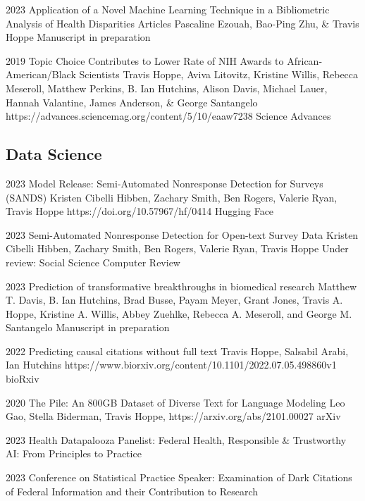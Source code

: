 \documentclass[]{scrartcl}
\begin{document}
\begin{cleanCV}
\Paper
{2023}
{Application of a Novel Machine Learning Technique in a Bibliometric Analysis of Health Disparities Articles}
{Pascaline Ezouah, Bao-Ping Zhu, \& Travis Hoppe}
{}{Manuscript in preparation}

\Paper
{2019}
{Topic Choice Contributes to Lower Rate of NIH Awards to African-American/Black Scientists}
{Travis Hoppe, Aviva Litovitz, Kristine Willis, Rebecca Meseroll, Matthew Perkins, B. Ian Hutchins, Alison Davis, Michael Lauer, Hannah Valantine, James Anderson, \& George Santangelo}
{https://advances.sciencemag.org/content/5/10/eaaw7238}
{Science Advances}

\subsection{Data Science}

\Paper
{2023}
{Model Release: Semi-Automated Nonresponse Detection for Surveys (SANDS)}
{Kristen Cibelli Hibben, Zachary Smith, Ben Rogers, Valerie Ryan, Travis Hoppe}
{https://doi.org/10.57967/hf/0414}
{Hugging Face}

\Paper
{2023}
{Semi-Automated Nonresponse Detection for Open-text Survey Data}
{Kristen Cibelli Hibben, Zachary Smith, Ben Rogers, Valerie Ryan, Travis Hoppe}
{}
{Under review: Social Science Computer Review}


\Paper
{2023}
{Prediction of transformative breakthroughs in biomedical research}
{Matthew T. Davis, B. Ian Hutchins, Brad Busse, Payam Meyer, Grant Jones, Travis A. Hoppe, Kristine A. Willis, Abbey Zuehlke, Rebecca A. Meseroll, and George M. Santangelo}
{}{Manuscript in preparation}

\Paper
{2022}
{Predicting causal citations without full text}
{Travis Hoppe, Salsabil Arabi, Ian Hutchins}
{https://www.biorxiv.org/content/10.1101/2022.07.05.498860v1}
{bioRxiv}

\Paper
{2020}
{The Pile: An 800GB Dataset of Diverse Text for Language Modeling}
{Leo Gao, Stella Biderman, Travis Hoppe, \etal}
{https://arxiv.org/abs/2101.00027}
{arXiv}



\WorkExperienceX
{2023}
{Health Datapalooza}
{Panelist: Federal Health, Responsible \& Trustworthy AI: From Principles to Practice}

\WorkExperienceX
{2023}
{Conference on Statistical Practice}
{Speaker: Examination of Dark Citations of Federal Information and their Contribution to Research}


\end{cleanCV}
\end{document}
